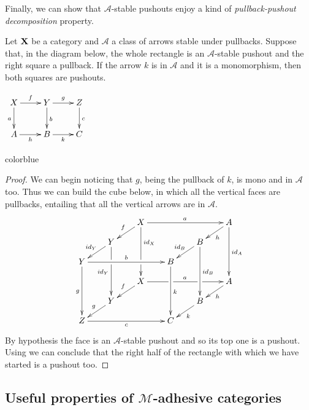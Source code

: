 \documentclass[a4paper,UKenglish,cleveref,pdftex,thm-restate,numberwithinsect,anonymous]{lipics}
\newcommand{\full}[1]{{color{blue}#1}}
\newcommand{\full}[1]{}
\newcommand{\id}[1]{\mathsf{id}_{#1}}
\def\X{\textbf {\textup{X}}}
\def\Y{\textbf {\textup{Y}}}
\begin{document}
Finally, we can show that $\mathcal{A}$-stable pushouts enjoy a kind of \emph{pullback-pushout decomposition} property.

\noindent 
\parbox{10cm}{
\begin{proposition}\label{prop:stab}Let $\X$ be a category and $\mathcal{A}$ a class of arrows stable under pullbacks. Suppose that, in the diagram below, the whole rectangle is an $\mathcal{A}$-stable pushout and the right square a pullback. If the arrow $k$ is in $\mathcal{A}$ and it is a monomorphism,  then both squares are pushouts.
\end{proposition}}
\parbox{4cm}{\vspace{-.3cm}
	$\xymatrix{X \ar[d]_{a} \ar[r]^{f}& \ar[r]^{g} Y \ar[d]^{b}& Z \ar[d]^{c}\\ A \ar[r]_{h}& B \ar[r]_{k}& C}$}

\full{ 
\begin{proof}
	We can begin noticing that $g$, being the pullback of $k$, is mono and in $\mathcal{A}$ too. Thus we can build the cube below, in which all the vertical faces are pullbacks, entailing that all the vertical arrows are in $\mathcal{A}$.
	\[\xymatrix@C=20pt@R=10pt{ & &X\ar[dl]_{f} \ar[ddd]^(.333333){\id{X}}|(.666666)\hole\ar[rrr]^{a} &&&A \ar[ddd]^{\id{A}} \ar[dl]^{h}\\& Y\ar[dl]_{\id{Y}} \ar[ddd]|(.333333)\hole_{\id{Y}} &&&B \ar[ddd]^{\id{B}} \ar[dl]_{\id{B}} \\Y \ar[ddd]_{g} \ar[rrr]^{b}&&& B\ar[ddd]^{k}\\&&X \ar[rrr]|(.34)\hole^{a}|(.67)\hole \ar[dl]_{f}&&& A \ar[dl]^{h}\\ & Y  \ar[dl]_{g}&&& B \ar[dl]^{k}\\ Z\ar[rrr]_{c} &&& C}\]
	By hypothesis the face is an $\mathcal{A}$-stable pushout and so its top one is a pushout. Using \Cref{lem:po1} we can conclude that the right half of the rectangle with which we have started is a pushout too.
\end{proof}}

\subsection{Useful properties of $\mathcal{M}$-adhesive categories}
\end{document}
